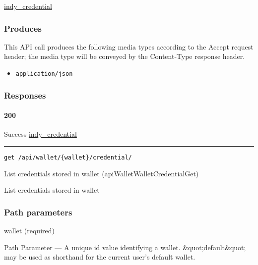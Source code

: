 \protect\hyperlink{indy_credential}{indy\_credential}

\hypertarget{produces-133}{%
\subsubsection{Produces}\label{produces-133}}

This API call produces the following media types according to the
{Accept} request header; the media type will be conveyed by the
{Content-Type} response header.

\begin{itemize}
\tightlist
\item
  \texttt{application/json}
\end{itemize}

\hypertarget{responses-136}{%
\subsubsection{Responses}\label{responses-136}}

\hypertarget{section-444}{%
\paragraph{200}\label{section-444}}

Success \protect\hyperlink{indy_credential}{indy\_credential}

\begin{center}\rule{0.5\linewidth}{\linethickness}\end{center}

\protect\hypertarget{apiWalletWalletCredentialGet}{}{}

\begin{verbatim}
get /api/wallet/{wallet}/credential/
\end{verbatim}

List credentials stored in wallet ({apiWalletWalletCredentialGet})

List credentials stored in wallet

\hypertarget{path-parameters-73}{%
\subsubsection{Path parameters}\label{path-parameters-73}}

wallet (required)

{Path Parameter} --- A unique id value identifying a wallet.
\&quot;default\&quot; may be used as shorthand for the current user's
default wallet.

